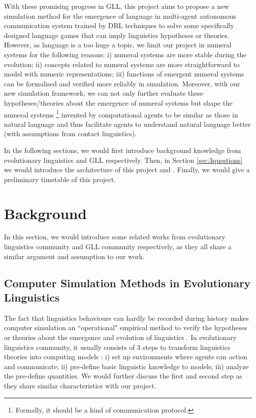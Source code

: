 \documentclass[a4paper,11pt]{article}
\begin{document}
With these promising progress in GLL, this project aims to propose a new simulation method for the emergence of language in multi-agent autonomous communication system trained by DRL techniques to solve some specifically designed language games that can imply linguistics hypotheses or theories. However, as language is a too huge a topic, we limit our project in numeral systems for the following reasons: i) numeral systems are more stable during the evolution; ii) concepts related to numeral systems are more straightforward to model with numeric representations; iii) functions of emergent numeral systems can be formalised and verified more reliably in simulation. Moreover, with our new simulation framework, we can not only further evaluate these hypotheses/theories about the emergence of numeral systems but shape the numeral systems \footnote{Formally, it should be a kind of communication protocol.} invented by computational agents to be similar as those in natural language and thus facilitate agents to understand natural language better (with assumptions from contact linguistics).

In the following sections, we would first introduce background knowledge from evolutionary linguistics and GLL respectively. Then, in Section \ref{sec:3questions} we would introduce the architecture of this project and . Finally, we would give a preliminary timetable of this project.


\section{Background}
\label{sec:2background}

In this section, we would introduce some related works from evolutionary linguistics community and GLL community respectively, as they all share a similar argument and assumption to our work.

\subsection{Computer Simulation Methods in Evolutionary Linguistics}
\label{ssec:2.1simulation_in_EL}

The fact that linguistics behaviours can hardly be recorded during history \cite{lieberman2006toward} makes computer simulation an ``operational" empirical method to verify the hypotheses or theories about the emergence and evolution of linguistics \cite{parisi2007emergence}. In evolutionary linguistics community, it usually consists of 3 steps to transform linguistics theories into computing models \cite{gong2013computer}: i) set up environments where agents can action and communicate; ii) pre-define basic linguistic knowledge to models; iii) analyze the pre-define quantities. We would further discuss the first and second step as they share similar characteristics with our project.
\end{document}
